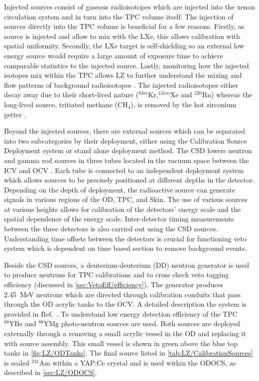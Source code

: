 Injected sources consist of gaseous radioisotopes which are injected into the xenon circulation system and in turn into the TPC volume itself. The injection of sources directly into the TPC volume is beneficial for a few reasons. Firstly, as source is injected and allow to mix with the LXe, this allows calibration with spatial uniformity. Secondly, the LXe target is self-shielding so an external low energy source would require a large amount of exposure time to achieve comparable statistics to the injected source. Lastly, monitoring how the injected isotopes mix within the TPC allows LZ to further understand the mixing and flow patterns of background radioisotopes \cite{LZ:2024bsz}. The injected radioisotopes either decay away due to their short-lived nature ($^{83m}\text{Kr}$,$^{131m}\text{Xe}$ and $^{220}\text{Rn}$) whereas the long-lived source, tritiated methane ($\text{CH}_4$), is removed by the hot zirconium getter \cite{LZNIMA}.

Beyond the injected sources, there are external sources which can be separated into two subcategories by their deployment, either using the Calibration Source Deployment system or stand alone deployment method. The CSD lowers neutron and gamma rod sources in three tubes located in the vacuum space between the ICV and OCV \cite{LZNIMA}. Each tube is connected to an independent deployment system which allows sources to be precisely positioned at different depths in the detector. Depending on the depth of deployment, the radioactive source can generate signals in various regions of the OD, TPC, and Skin. The use of various sources at various heights allows for calibration of the detectors' energy scale and the spatial dependence of the energy scale. Inter-detector timing measurements between the three detectors is also carried out using the CSD sources. Understanding time offsets between the detectors is crucial for functioning veto system which is dependent on time based section to remove background events.

Beside the CSD sources, a deuterium-deuterium (DD) neutron generator is used to produce neutrons for TPC calibrations and to cross check veto tagging efficiency (discussed in \autoref{sec:VetoEff/efficiency}). The generator produces 2.45~MeV neutrons which are directed through calibration conduits that pass through the OD acrylic tanks to the OCV. A detailed description the system is provided in Ref.~\cite{LZ:2024bsz}. To understand low energy detection efficiency of the TPC $^{88}\text{YBe}$ and $^{88}\text{YMg}$ photo-neutron sources are used. Both sources are deployed externally through a removing a small acrylic vessel in the OD and replacing it with source assembly. This small vessel is shown in green above the blue top tanks in  \autoref{fig:LZ/ODTanks}.
The final source listed in \autoref{tab:LZ/CalibrationSources} is sealed $^{241}\text{Am}$ within a YAP:Ce crystal and is used within the ODOCS, as described in \autoref{sec:LZ/ODOCS}.

